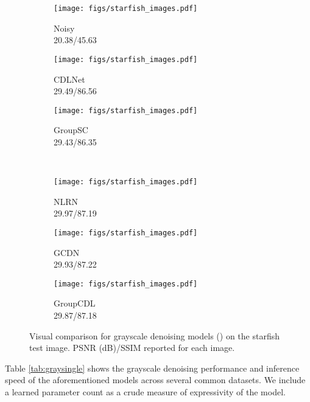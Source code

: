 \documentclass[lettersize,journal]{IEEEtran}
\begin{document}
\begin{figure}[thb]
    \centering
    \captionsetup{justification=centering,singlelinecheck=false}
    \begin{subfigure}{0.31\columnwidth}
    \centering
    \texttt{[image: figs/starfish\_images.pdf]}
    \caption{Noisy \\ 20.38/45.63}
\end{subfigure}\hfill \begin{subfigure}{0.31\columnwidth}
    \centering
    \texttt{[image: figs/starfish\_images.pdf]}
    \caption{CDLNet \cite{janjusevicCDLNet2022} \\ 29.49/86.56}
\end{subfigure}\hfill \begin{subfigure}{0.31\columnwidth}
    \centering
    \texttt{[image: figs/starfish\_images.pdf]}
    \caption{GroupSC \cite{lecouat2020nonlocal} \\ 29.43/86.35}
\end{subfigure}\\
\begin{subfigure}{0.31\columnwidth}
    \centering
    \texttt{[image: figs/starfish\_images.pdf]}
    \caption{NLRN \cite{liu2018non} \\ 29.97/87.19}
\end{subfigure}\hfill \begin{subfigure}{0.31\columnwidth}
    \centering
    \texttt{[image: figs/starfish\_images.pdf]}
    \caption{GCDN \cite{Valsesia2020} \\ 29.93/87.22}
\end{subfigure}\hfill \begin{subfigure}{0.31\columnwidth}
    \centering
    \texttt{[image: figs/starfish\_images.pdf]}
    \caption{GroupCDL \\ 29.87/87.18}
\end{subfigure}      \captionsetup{justification=justified,singlelinecheck=false}
    \caption{
        Visual comparison for grayscale denoising models
        () on the starfish test image. PSNR (dB)/SSIM reported for each image.
    }
    \label{fig:graysingle}
\end{figure}
Table \ref{tab:graysingle} shows the grayscale
denoising performance and inference speed of the aforementioned models across
several common datasets. We
include a learned parameter count as a crude measure of expressivity of the model.
\end{document}
